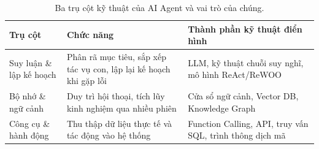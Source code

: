 \begin{table}[!htbp]\centering
\caption{Ba trụ cột kỹ thuật của AI Agent và vai trò của chúng.}\label{tab:ch1-pillars}
\small
\begin{tabularx}{\linewidth}{L{3.6cm}XX}
\toprule
\textbf{Trụ cột} & \textbf{Chức năng} & \textbf{Thành phần kỹ thuật điển hình} \\
\midrule
Suy luận \& lập kế hoạch & Phân rã mục tiêu, sắp xếp tác vụ con, lập lại kế hoạch khi gặp lỗi & LLM, kỹ thuật
chuỗi suy nghĩ, mô hình ReAct/ReWOO \\
Bộ nhớ \& ngữ cảnh & Duy trì hội thoại, tích lũy kinh nghiệm qua nhiều phiên & Cửa sổ ngữ cảnh, Vector DB,
Knowledge Graph \\
Công cụ \& hành động & Thu thập dữ liệu thực tế và tác động vào hệ thống & Function Calling, API, truy vấn SQL,
trình thông dịch mã \\
\bottomrule
\end{tabularx}
\end{table}
